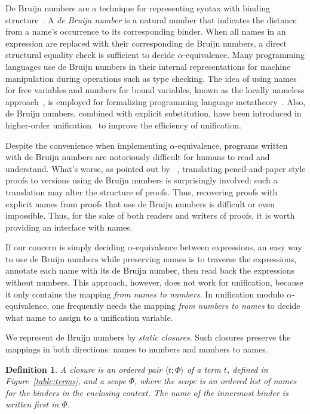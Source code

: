 \documentclass{easychair}
\newtheorem{defi}{Definition}[section]
\newcommand{\clos}[2] {
\langle #1; #2 \rangle
}
\begin{document}
De Bruijn numbers are a technique for representing syntax with binding
structure~\citep{de_bruijn_lambda_1972}. A \emph{de Bruijn number} is
a natural number that indicates the distance from a name's occurrence
to its corresponding binder. When all names in an expression are
replaced with their corresponding de Bruijn numbers, a direct
structural equality check is sufficient to decide
$\alpha$-equivalence. Many programming languages use de Bruijn numbers
in their internal representations for machine manipulation during
operations such as type checking. The idea of using names for free
variables and numbers for bound variables, known as the locally
nameless approach~\citep{chargueraud_locally_2012}, is employed for
formalizing programming language metatheory~\citep{aydemir_nominal_2006,
aydemir_engineering_2008}. Also, de Bruijn numbers, combined with
explicit substitution, have been introduced in higher-order
unification~\citep{dowek_higher_2000} to improve the efficiency of
unification.

Despite the convenience when implementing $\alpha$-equivalence,
programs written with de Bruijn numbers are notoriously difficult for
humans to read and understand. What's worse, as pointed out by
~\citet{berghofer_head--head_2007}, translating
pencil-and-paper style proofs to versions using de Bruijn numbers is
surprisingly involved: such a translation may alter the structure of
proofs. Thus, recovering proofs with explicit names from proofs that use de
Bruijn numbers is difficult or even impossible. Thus, for the sake of
both readers and writers of proofs, it is worth providing an interface
with names.

If our concern is simply deciding $\alpha$-equivalence between
expressions, an easy way to use de Bruijn numbers while preserving
names is to traverse the expressions, annotate each name with its de
Bruijn number, then read back the expressions without numbers. This
approach, however, does not work for unification, because it only
contains the mapping \emph{from names to numbers}. In unification
modulo $\alpha$-equivalence, one frequently needs the mapping
\emph{from numbers to names} to decide what name to assign to a
unification variable.

We represent de Bruijn numbers by \emph{static closures}.
Such closures preserve the
mappings in both directions: names to numbers and numbers to names.

\begin{defi}
A \emph{closure} is an ordered pair $\clos{t}{\Phi}$ of a term $t$,
defined in Figure~\ref{table:terms}, and a scope $\Phi$, where the
scope is an ordered list of names for the binders in the enclosing
context. The name of the innermost binder is written first in $\Phi$.
\end{defi}
\end{document}
